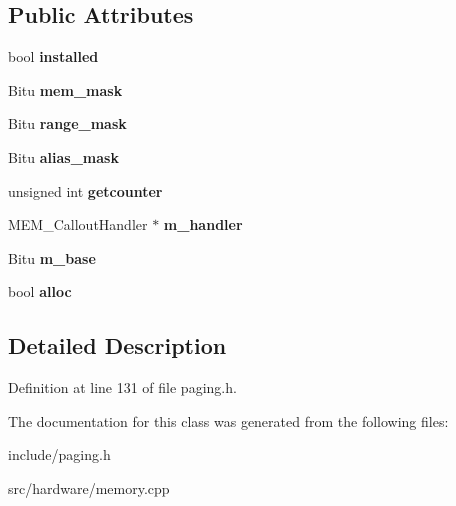 \subsection*{Public Attributes}
\begin{DoxyCompactItemize}
\item 
\hypertarget{classMEM__CalloutObject_a7b541b8ebca7dc3f4d270ed3b452e728}{bool {\bfseries installed}}\label{classMEM__CalloutObject_a7b541b8ebca7dc3f4d270ed3b452e728}

\item 
\hypertarget{classMEM__CalloutObject_a4e9e808b42695910067942ba96910a4a}{Bitu {\bfseries mem\-\_\-mask}}\label{classMEM__CalloutObject_a4e9e808b42695910067942ba96910a4a}

\item 
\hypertarget{classMEM__CalloutObject_abf0675214f67f07ed55398b4f3134c52}{Bitu {\bfseries range\-\_\-mask}}\label{classMEM__CalloutObject_abf0675214f67f07ed55398b4f3134c52}

\item 
\hypertarget{classMEM__CalloutObject_a9943a9b012fbe4062165212e82eb9a40}{Bitu {\bfseries alias\-\_\-mask}}\label{classMEM__CalloutObject_a9943a9b012fbe4062165212e82eb9a40}

\item 
\hypertarget{classMEM__CalloutObject_a7c878c0fd1220ff368d99f711ddfc72b}{unsigned int {\bfseries getcounter}}\label{classMEM__CalloutObject_a7c878c0fd1220ff368d99f711ddfc72b}

\item 
\hypertarget{classMEM__CalloutObject_a3c74b9fe23f7c0c1f2509af29527fc02}{M\-E\-M\-\_\-\-Callout\-Handler $\ast$ {\bfseries m\-\_\-handler}}\label{classMEM__CalloutObject_a3c74b9fe23f7c0c1f2509af29527fc02}

\item 
\hypertarget{classMEM__CalloutObject_ac31010e57ee064b986e747a978bdb093}{Bitu {\bfseries m\-\_\-base}}\label{classMEM__CalloutObject_ac31010e57ee064b986e747a978bdb093}

\item 
\hypertarget{classMEM__CalloutObject_ab0bd7d892bbbe4ae49e5a0e40812fc61}{bool {\bfseries alloc}}\label{classMEM__CalloutObject_ab0bd7d892bbbe4ae49e5a0e40812fc61}

\end{DoxyCompactItemize}


\subsection{Detailed Description}


Definition at line 131 of file paging.\-h.



The documentation for this class was generated from the following files\-:\begin{DoxyCompactItemize}
\item 
include/paging.\-h\item 
src/hardware/memory.\-cpp\end{DoxyCompactItemize}
